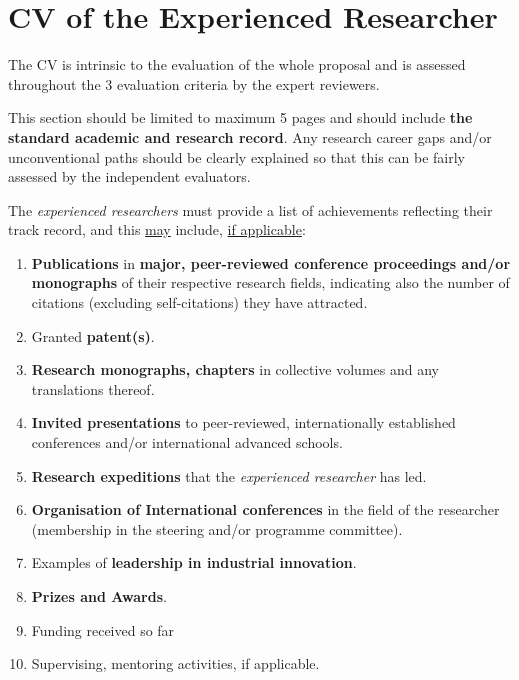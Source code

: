 
\newpage
{}
\section{CV of the Experienced Researcher}
\label{sec:cv}

The CV is intrinsic to the evaluation of the whole proposal and is assessed throughout the 3 evaluation criteria by the expert reviewers.

\medskip\noindent
This section should be limited to maximum 5 pages and should include \textbf{the standard academic and research record}. 
Any research career gaps and/or unconventional paths should be clearly explained so that this can be fairly assessed by the independent evaluators.

\medskip\noindent
The {\em experienced researchers} must provide a list of achievements reflecting their track record, and this \ul{may} include, \ul{if applicable}:

\begin{enumerate}
\item \textbf{Publications} in \textbf{major, peer-reviewed conference proceedings and/or monographs} of their respective research fields, indicating also the number of citations (excluding self-citations) they have attracted.
\item Granted \textbf{patent(s)}.
\item \textbf{Research monographs, chapters} in collective volumes and any translations thereof.
\item \textbf{Invited presentations} to peer-reviewed, internationally established conferences and/or international advanced schools.
\item \textbf{Research expeditions} that the {\em experienced researcher} has led. 
\item \textbf{Organisation of International conferences} in the field of the researcher (membership in the steering and/or programme committee).
\item Examples of \textbf{leadership in industrial innovation}.
\item \textbf{Prizes and Awards}.
\item Funding received so far
\item Supervising, mentoring activities, if applicable.
\end{enumerate}





